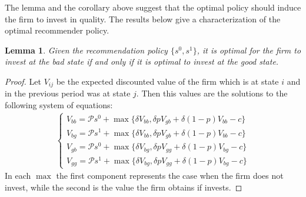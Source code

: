 \documentclass[a4paper]{article}
\newtheorem{lemma}[theorem]{Lemma}
\begin{document}
The lemma and the corollary above suggest that the optimal policy should induce the firm to invest in quality. The results below give a characterization of the optimal recommender policy.
\begin{lemma}
	Given the recommendation policy $\{s^0, s^1\}$, it is optimal for the firm to invest at the bad state if and only if it is optimal to invest at the good state.
\end{lemma} 
\begin{proof}
	Let $V_{ij}$ be the expected discounted value of the firm which is at state $i$ and in the previous period was at state $j$. Then this values are the solutions to the following system of equations:
	\begin{align}\label{eq1}
	\begin{cases}
	V_{bb} = \mathcal{P}s^0 + \max\{\delta V_{bb}, \delta p V_{gb} + \delta (1-p)V_{bb} - c\}\\
	V_{bg} = \mathcal{P}s^1 + \max\{\delta V_{bb}, \delta p V_{gb} + \delta (1-p)V_{bb} - c\}\\
	V_{gb} = \mathcal{P}s^0 + \max\{\delta V_{bg}, \delta p V_{gg} + \delta (1-p)V_{bg} - c\}\\
	V_{gg} = \mathcal{P}s^1 + \max\{\delta V_{bg}, \delta p V_{gg} + \delta (1-p)V_{bg} - c\}
	\end{cases}
	\end{align}
	In each $\max$ the first component represents the case when the firm does not invest, while the second is the value the firm obtains if invests. 
	

\end{proof}
\end{document}
